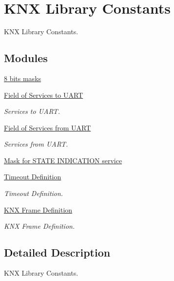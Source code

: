 \hypertarget{group___k_n_x___lib___constants}{}\section{K\+NX Library Constants}
\label{group___k_n_x___lib___constants}


K\+NX Library Constants.  


\subsection*{Modules}
\begin{DoxyCompactItemize}
\item 
\hyperlink{group_____bits___masks}{8 bits masks}
\item 
\hyperlink{group___u_a_r_t___control___to}{Field of Services to U\+A\+RT}
\begin{DoxyCompactList}\small\item\em Services to U\+A\+RT. \end{DoxyCompactList}\item 
\hyperlink{group___u_a_r_t___control___from}{Field of Services from U\+A\+RT}
\begin{DoxyCompactList}\small\item\em Services from U\+A\+RT. \end{DoxyCompactList}\item 
\hyperlink{group___u_a_r_t___control___mask}{Mask for S\+T\+A\+T\+E I\+N\+D\+I\+C\+A\+T\+I\+O\+N service}
\item 
\hyperlink{group___k_n_x___timeout}{Timeout Definition}
\begin{DoxyCompactList}\small\item\em Timeout Definition. \end{DoxyCompactList}\item 
\hyperlink{group___k_n_x___frame}{K\+N\+X Frame Definition}
\begin{DoxyCompactList}\small\item\em K\+NX Frame Definition. \end{DoxyCompactList}\end{DoxyCompactItemize}


\subsection{Detailed Description}
K\+NX Library Constants. 

